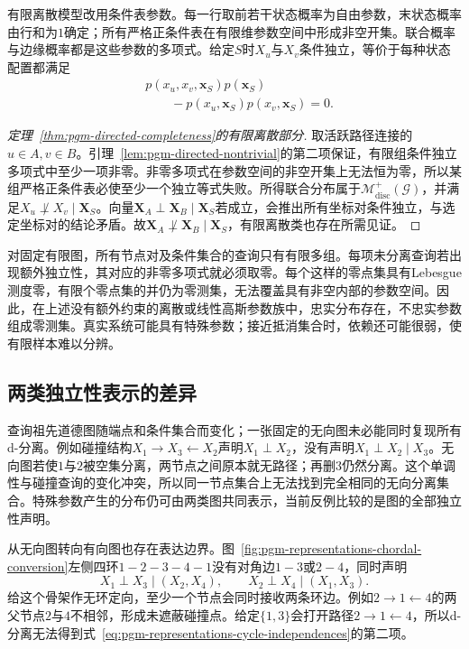 有限离散模型改用条件表参数。每一行取前若干状态概率为自由参数，末状态概率由行和为$1$确定；所有严格正条件表在有限维参数空间中形成非空开集。联合概率与边缘概率都是这些参数的多项式。给定$S$时$X_u$与$X_v$条件独立，等价于每种状态配置都满足
\[
  \begin{aligned}
    &p(x_u,x_v,\bm x_S)p(\bm x_S)\\
    &\qquad{}-p(x_u,\bm x_S)p(x_v,\bm x_S)=0.
  \end{aligned}
\]

\begin{proof}[定理~\ref{thm:pgm-directed-completeness}的有限离散部分]
取活跃路径连接的$u\in A,v\in B$。引理~\ref{lem:pgm-directed-nontrivial}的第二项保证，有限组条件独立多项式中至少一项非零。非零多项式在参数空间的非空开集上无法恒为零，所以某组严格正条件表必使至少一个独立等式失败。所得联合分布属于$\mathcal{M}_{\mathrm{disc}}^{+}(\mathcal{G})$，并满足$X_u\not\perp X_v\mid\bm X_S$。向量$\bm X_A\perp\bm X_B\mid\bm X_S$若成立，会推出所有坐标对条件独立，与选定坐标对的结论矛盾。故$\bm X_A\not\perp\bm X_B\mid\bm X_S$，有限离散类也存在所需见证。
\end{proof}

对固定有限图，所有节点对及条件集合的查询只有有限多组。每项未分离查询若出现额外独立性，其对应的非零多项式就必须取零。每个这样的零点集具有Lebesgue测度零，有限个零点集的并仍为零测集，无法覆盖具有非空内部的参数空间。因此，在上述没有额外约束的离散或线性高斯参数族中，忠实分布存在，不忠实参数组成零测集。真实系统可能具有特殊参数；接近抵消集合时，依赖还可能很弱，使有限样本难以分辨。

\subsection{两类独立性表示的差异}
\label{sec:pgm-representations-independence-differences}

查询祖先道德图随端点和条件集合而变化；一张固定的无向图未必能同时复现所有d-分离。例如碰撞结构$X_1\to X_3\leftarrow X_2$声明$X_1\perp X_2$，没有声明$X_1\perp X_2\mid X_3$。无向图若使$1$与$2$被空集分离，两节点之间原本就无路径；再删$3$仍然分离。这个单调性与碰撞查询的变化冲突，所以同一节点集合上无法找到完全相同的无向分离集合。特殊参数产生的分布仍可由两类图共同表示，当前反例比较的是图的全部独立性声明。

从无向图转向有向图也存在表达边界。图~\ref{fig:pgm-representations-chordal-conversion}左侧四环$1-2-3-4-1$没有对角边$1-3$或$2-4$，同时声明
\begin{equation}
  X_1\perp X_3\mid(X_2,X_4),\qquad
  X_2\perp X_4\mid(X_1,X_3).
  \label{eq:pgm-representations-cycle-independences}
\end{equation}
给这个骨架作无环定向，至少一个节点会同时接收两条环边。例如$2\to1\leftarrow4$的两父节点$2$与$4$不相邻，形成未遮蔽碰撞点。给定$\{1,3\}$会打开路径$2\to1\leftarrow4$，所以d-分离无法得到式~\eqref{eq:pgm-representations-cycle-independences}的第二项。

